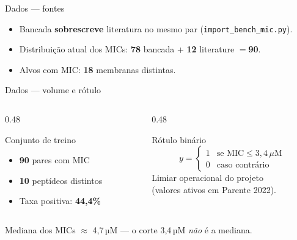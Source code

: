 \documentclass[aspectratio=169,10pt]{beamer}
\begin{document}
\begin{frame}{Dados --- fontes}
\begin{center}
\end{center}
\vspace{0.35cm}
\begin{itemize}
  \item Bancada \textbf{sobrescreve} literatura no mesmo par (\texttt{import\_bench\_mic.py}).
  \item Distribuição atual dos MICs: \textbf{78} bancada + \textbf{12} literature $=$\textbf{90}.
  \item Alvos com MIC: \textbf{18} membranas distintas.
\end{itemize}
\end{frame}

\begin{frame}{Dados --- volume e rótulo}
\begin{columns}[T]
\begin{column}{0.48\textwidth}
\begin{block}{Conjunto de treino}
\begin{itemize}
  \item \textbf{90} pares com MIC
  \item \textbf{10} peptídeos distintos
  \item Taxa positiva: \textbf{44,4\%}
\end{itemize}
\end{block}
\end{column}
\begin{column}{0.48\textwidth}
\begin{block}{Rótulo binário}
\[
y = \begin{cases}
1 & \text{se MIC} \le 3{,}4\,\mu\text{M}\\
0 & \text{caso contrário}
\end{cases}
\]
{\scriptsize Limiar operacional do projeto\\
(valores ativos em Parente 2022).}
\end{block}
\end{column}
\end{columns}
\vspace{0.4cm}
\begin{center}
{\small Mediana dos MICs $\approx$ 4,7\,µM --- o corte 3,4\,µM \emph{não} é a mediana.}
\end{center}
\end{frame}
\end{document}
